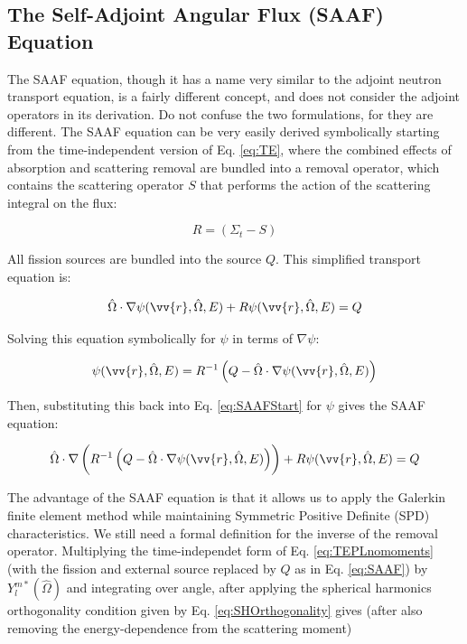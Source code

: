 \documentclass[10pt]{article}
\newcommand{\hO}{\hat{\Omega}}
\begin{document}
\begin{flushleft}
\section{The Self-Adjoint Angular Flux (SAAF) Equation}

The SAAF equation, though it has a name very similar to the adjoint neutron transport equation, is a fairly different concept, and does not consider the adjoint operators in its derivation. Do not confuse the two formulations, for they are different. The SAAF equation can be very easily derived symbolically starting from the time-independent version of Eq. \ref{eq:TE}, where the combined effects of absorption and scattering removal are bundled into a removal operator, which contains the scattering operator \(S\) that performs the action of the scattering integral on the flux:

\begin{equation}
\label{eq:SAAFRemovalOperator}
R = (\Sigma_t - S)
\end{equation}

All fission sources are bundled into the source \(Q\). This simplified transport equation is:

\begin{equation}
\label{eq:SAAFStart}
\hO  \cdot\nabla\psi(\vv{r}, \hO  , E) + R\psi(\vv{r}, \hO  , E) = Q
\end{equation}

Solving this equation symbolically for \(\psi\) in terms of \(\nabla\psi\):

\begin{equation}
\label{eq:SAAFStep1}
\psi(\vv{r}, \hO  , E) = R^{-1}\left(Q-\hO  \cdot\nabla\psi(\vv{r}, \hO  , E)\right)
\end{equation}

Then, substituting this back into Eq. \ref{eq:SAAFStart} for \(\psi\) gives the SAAF equation:

\begin{equation}
\label{eq:SAAF}
\hO   \cdot \nabla \left( R^{-1}\left(Q-\hO  \cdot\nabla\psi(\vv{r}, \hO  , E)\right)\right) + R\psi(\vv{r}, \hO  , E) = Q
\end{equation}

The advantage of the SAAF equation is that it allows us to apply the Galerkin finite element method while maintaining Symmetric Positive Definite (SPD) characteristics. We still need a formal definition for the inverse of the removal operator. Multiplying the time-independet form of Eq. \ref{eq:TEPLnomoments} (with the fission and external source replaced by \(Q\) as in Eq. \ref{eq:SAAF}) by \(Y_l^{m*}(\hO  )\) and integrating over angle, after applying the spherical harmonics orthogonality condition given by Eq. \ref{eq:SHOrthogonality} gives (after also removing the energy-dependence from the scattering moment)


\end{flushleft}
\end{document}
